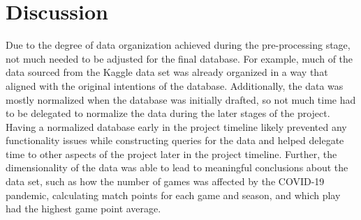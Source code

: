 \section{Discussion}
Due to the degree of data organization achieved during the pre-processing stage, not much needed to be adjusted for the final database. For example, much of the data sourced from the Kaggle data set was already organized in a way that aligned with the original intentions of the database. Additionally, the data was mostly normalized when the database was initially drafted, so not much time had to be delegated to normalize the data during the later stages of the project. Having a normalized database early in the project timeline likely prevented any functionality issues while constructing queries for the data and helped delegate time to other aspects of the project later in the project timeline. Further, the dimensionality of the data was able to lead to meaningful conclusions about the data set, such as how the number of games was affected by the COVID-19 pandemic, calculating match points for each game and season, and which play had the highest game point average. 


